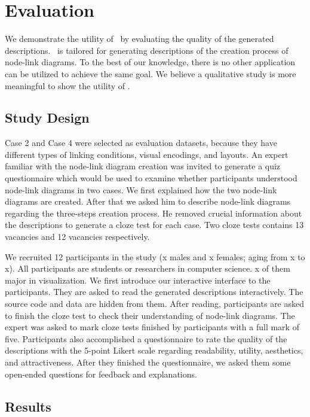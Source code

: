 \section{Evaluation}
We demonstrate the utility of \ApproachName~by evaluating the quality of the generated descriptions.
\ApproachName~is tailored for generating descriptions of the creation process of node-link diagrams.
To the best of our knowledge, there is no other application can be utilized to achieve the same goal.
We believe a qualitative study is more meaningful to show the utility of \ApproachName.

\subsection{Study Design}
Case 2 and Case 4 were selected as evaluation datasets,
because they have different types of linking conditions, visual encodings, and layouts.
An expert familiar with the node-link diagram creation was invited to generate a quiz questionnaire which would be used to examine whether participants understood node-link diagrams in two cases.
We first explained how the two node-link diagrams are created.
After that we asked him to describe node-link diagrams regarding the three-steps creation process.
He removed crucial information about the descriptions to generate a cloze test for each case.
Two cloze tests contains 13 vacancies and 12 vacancies respectively.

We recruited 12 participants in the study ({\color{red}x} males and {\color{red}x} females; aging from {\color{red}x} to {\color{red}x}).
All participants are students or researchers in computer science.
{\color{red}x} of them major in visualization.
We first introduce our interactive interface to the participants.
They are asked to read the generated descriptions interactively.
The source code and data are hidden from them.
After reading, participants are asked to finish the cloze test to check their understanding of node-link diagrams.
The expert was asked to mark cloze tests finished by participants with a full mark of five.
Participants also accomplished a questionnaire to rate the quality of the descriptions with the 5-point Likert scale regarding readability, utility, aesthetics, and attractiveness.
After they finished the questionnaire, we asked them some open-ended questions for feedback and explanations.



\subsection{Results}